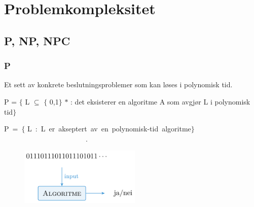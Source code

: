 \documentclass[12pt]{report}
\begin{document}




\newpage
\par

\setlength{\parskip}{15.0pt}
\section*{Problemkompleksitet}
\setlength{\parskip}{6.0pt}
\subsection*{P, NP, NPC}
\subsubsection*{P}

\vspace{\baselineskip}
Et sett av konkrete beslutningsproblemer som kan løses i polynomisk tid. \par

\begin{Center}
P = $ \{ $ L $ \subseteq $  $ \{ $ 0,1$ \} $ $\ast$  : det eksisterer en algoritme A som avgjør L i polynomisk tid$ \} $ 
\end{Center}\par

\begin{Center}
P\ =\ $ \{ $ L\ :\ L\ er\ akseptert\ av\ en\ polynomisk-tid\ algoritme$ \} $ \ \ \ \ \ \ \ \ \ \ \ \ \ \ \ \ \ \ \ \ \ \ \            .
\end{Center}\par




\begin{figure}[H]
	\begin{Center}
		\includegraphics[width=2.27in,height=1.07in]{./media/image152.png}
	\end{Center}
\end{figure}
\end{document}
